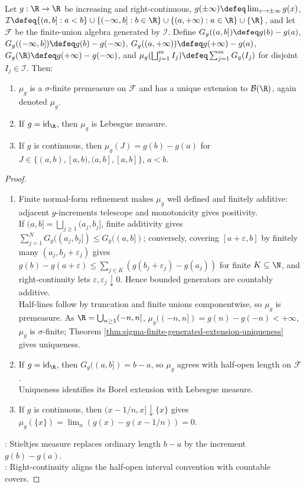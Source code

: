 \begin{theorem} \label{thm:borel-stieltjes-measure-continuous-increasing}\label{thm:borel-stieltjes-measure-generation} \\
Let $g:\R\to\R$ be increasing and right-continuous, $g(\pm\infty)\defeq\lim_{x\to\pm\infty}g(x)$,\\
$\mathcal{I}\defeq\{(a,b]:a<b\}\cup\{(-\infty,b]:b\in\R\}\cup\{(a,+\infty):a\in\R\}\cup\{\R\}$, and let $\mathcal{F}$ be the finite-union algebra generated by $\mathcal{I}$. Define $G_g((a,b])\defeq g(b)-g(a)$, $G_g((-\infty,b])\defeq g(b)-g(-\infty)$, $G_g((a,+\infty))\defeq g(+\infty)-g(a)$, $G_g(\R)\defeq g(+\infty)-g(-\infty)$, and $\mu_g(\bigsqcup_{j=1}^{m}I_j)\defeq\sum_{j=1}^{m}G_g(I_j)$ for disjoint $I_j\in\mathcal{I}$. Then:
\begin{enumerate}[label=(\roman*)]
\setlength{\itemsep}{0pt}
\item $\mu_g$ is a $\sigma$-finite premeasure on $\mathcal{F}$ and has a unique extension to $\mathcal{B}(\R)$, again denoted $\mu_g$.
\item If $g=\operatorname{id}_{\R}$, then $\mu_g$ is Lebesgue measure.
\item If $g$ is continuous, then $\mu_g(J)=g(b)-g(a)$ for $J\in\{(a,b),[a,b),(a,b],[a,b]\}$, $a<b$.
\end{enumerate}
\begin{proof}
\begin{enumerate}[label=(\roman*)]
\setlength{\itemsep}{0pt}
\item Finite normal-form refinement makes $\mu_g$ well defined and finitely additive: adjacent $g$-increments telescope and monotonicity gives positivity.\\
If $(a,b]=\bigsqcup_{j\geq1}(a_j,b_j]$, finite additivity gives $\sum_{j=1}^{N}G_g((a_j,b_j])\leq G_g((a,b])$; conversely, covering $[a+\varepsilon,b]$ by finitely many $(a_j,b_j+\varepsilon_j)$ gives $g(b)-g(a+\varepsilon)\leq\sum_{j\in K}(g(b_j+\varepsilon_j)-g(a_j))$ for finite $K\subseteq\N$, and right-continuity lets $\varepsilon,\varepsilon_j\downarrow0$. Hence bounded generators are countably additive.\\
Half-lines follow by truncation and finite unions componentwise, so $\mu_g$ is premeasure. As $\R=\bigcup_{n\geq1}(-n,n]$, $\mu_g((-n,n])=g(n)-g(-n)<+\infty$, $\mu_g$ is $\sigma$-finite; Theorem \ref{thm:sigma-finite-generated-extension-uniqueness} gives uniqueness.
\item If $g=\operatorname{id}_{\R}$, then $G_g((a,b])=b-a$, so $\mu_g$ agrees with half-open length on $\mathcal{F}$.\\
Uniqueness identifies its Borel extension with Lebesgue measure.
\item If $g$ is continuous, then $(x-1/n,x]\downarrow\{x\}$ gives $\mu_g(\{x\})=\lim_n(g(x)-g(x-1/n))=0$.
\end{enumerate}
: Stieltjes measure replaces ordinary length $b-a$ by the increment $g(b)-g(a)$.\\
: Right-continuity aligns the half-open interval convention with countable covers.
\end{proof}
\end{theorem}

